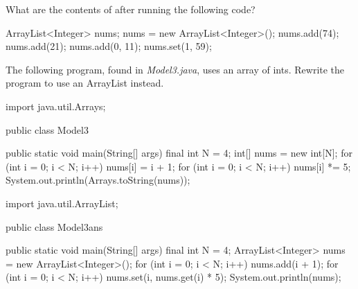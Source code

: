 \Q What are the contents of  after running the following code?

\begin{javalst}
ArrayList<Integer> nums;
nums = new ArrayList<Integer>();
nums.add(74);
nums.add(21);
nums.add(0, 11);
nums.set(1, 59);
\end{javalst}

\begin{answer}[2em]
[11, 59, 21]
\end{answer}


\newpage

\Q \label{key3}
The following program, found in \textit{Model3.java}, uses an array of ints.
Rewrite the program to use an ArrayList instead.

\vspace{1ex}

\begin{javalst}
import java.util.Arrays;

public class Model3 {

    public static void main(String[] args) {
        final int N = 4;
        int[] nums = new int[N];
        for (int i = 0; i < N; i++) {
            nums[i] = i + 1;
        }
        for (int i = 0; i < N; i++) {
            nums[i] *= 5;
        }
        System.out.println(Arrays.toString(nums));
    }

}
\end{javalst}

\begin{answer}[22em]
\begin{javaans}
import java.util.ArrayList;

public class Model3ans {

    public static void main(String[] args) {
        final int N = 4;
        ArrayList<Integer> nums = new ArrayList<Integer>();
        for (int i = 0; i < N; i++) {
            nums.add(i + 1);
        }
        for (int i = 0; i < N; i++) {
            nums.set(i, nums.get(i) * 5);
        }
        System.out.println(nums);
    }

}
\end{javaans}
\end{answer}
